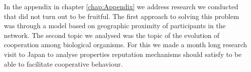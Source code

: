 \noindent{}In the appendix in chapter \ref{chap:Appendix} we address research we conducted that did not turn out to be fruitful. The first approach to solving this problem was through a model based on geographic proximity of participants in the network. The second topic we analysed was the topic of the evolution of cooperation among biological organisms. For this we made a month long research visit to Japan to analyse properties reputation mechanisms should satisfy to be able to facilitate cooperative behaviour. \vspace{1em}\\

